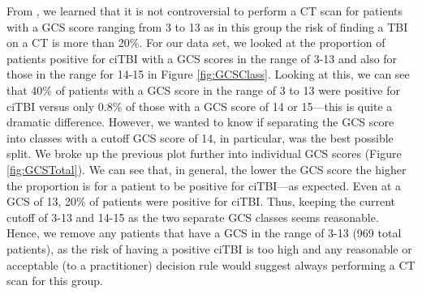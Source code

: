 \documentclass[11pt, letterpaper]{amsart}
\begin{document}
From \cite{kuppermann2009identification}, we learned that it is not controversial to perform a CT scan for patients with a GCS score ranging from 3 to 13 as in this group the risk of finding a TBI on a CT is more than 20\%. For our data set, we looked at the proportion of patients positive for ciTBI with a GCS scores in the range of 3-13 and also for those in the range for 14-15 in Figure \ref{fig:GCSClass}. Looking at this, we can see that 40\% of patients with a GCS score in the range of 3 to 13 were positive for ciTBI versus only 0.8\% of those with a GCS score of 14 or 15---this is quite a dramatic difference. However, we wanted to know if separating the GCS score into classes with a cutoff GCS score of 14, in particular, was the best possible split. We broke up the previous plot further into individual GCS scores (Figure \ref{fig:GCSTotal}). We can see that, in general, the lower the GCS score the higher the proportion is for a patient to be positive for ciTBI---as expected. Even at a GCS of 13, 20\% of patients were positive for ciTBI. Thus, keeping the current cutoff of 3-13 and 14-15 as the two separate GCS classes seems reasonable. Hence, we remove any patients that have a GCS in the range of 3-13 (969 total patients), as the risk of having a positive ciTBI is too high and any reasonable or acceptable (to a practitioner) decision rule would suggest always performing a CT scan for this group.
\end{document}
